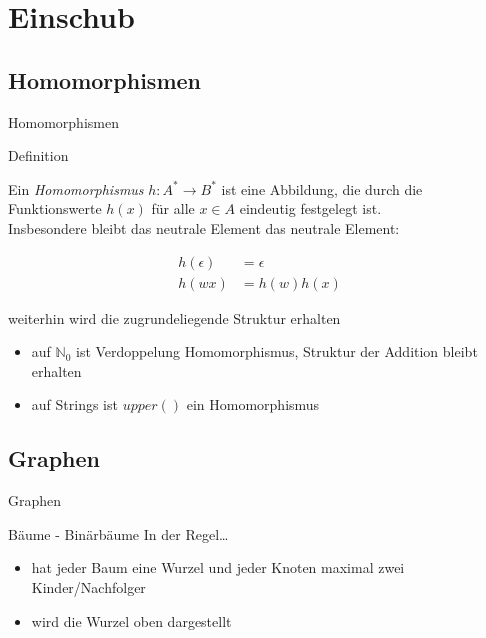 \section{Einschub}
\subsection{Homomorphismen}
\begin{frame}{Homomorphismen}
\begin{block}{Definition}

Ein \emph{Homomorphismus} $h:A^* \rightarrow B^*$ ist eine Abbildung, die
durch die Funktionswerte $h(x)$ für alle $x\in A$ eindeutig festgelegt ist. \\ \pause
Insbesondere bleibt das neutrale Element das neutrale Element:

	\begin{align*}
    h(\epsilon) &= \epsilon \\
  	   	  h(wx) &= h(w) h(x)
	\end{align*}
	
	weiterhin wird die zugrundeliegende Struktur erhalten
	     \begin{itemize}
       \item auf $\mathbb{N}_0$ ist Verdoppelung Homomorphismus, Struktur der Addition bleibt erhalten
       \item auf Strings ist $upper()$ ein Homomorphismus
     \end{itemize}
\end{block}
\end{frame}


\subsection{Graphen}
\begin{frame}{Graphen}

 	\begin{block}{Bäume - Binärbäume}
     In der Regel\dots
     \begin{itemize}
       \item hat jeder Baum eine Wurzel und jeder Knoten maximal zwei Kinder/Nachfolger
       \item wird die Wurzel oben dargestellt
     \end{itemize}
	\end{block}
\end{frame}

